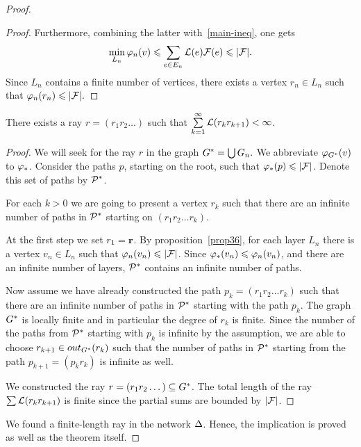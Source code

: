 \documentclass[12pt,oneside,a4paper]{amsart}
\begin{document}
\begin{proof}
\begin{proof}
            Furthermore, combining the latter with~\eqref{main-ineq}, one gets
              \[
              \min_{L_n} \phi_n(v) \leq \sum_{e \in E_n} \len(e) \flowpos(e) \leq \lvert\flowpos\rvert.
              \]
            Since $L_n$ contains a finite number of vertices, there exists a vertex $r_n \in L_n$ such that
              $\phi_n(r_n) \leq \lvert\flowpos\rvert.$
          \end{proof}
          \begin{prop}
            There exists a ray $r=(r_1 r_2\dots)$ such that $\sum\limits_{k=1}^\infty \len(r_kr_{k+1}) < \infty$.
          \end{prop}
          \begin{proof}
            We will seek for the ray $r$ in the graph $\gstar = \bigcup G_n.$
            We abbreviate $\phi_{\gstar}(v)$ to $\phistar$.
            Consider the paths $p$, starting on the root, such that $\phistar(p) \leq \lvert\flowpos\rvert$.
            Denote this set of paths by $\cal{P}^*$.

            For each $k > 0$ we are going to present a vertex $r_k$ such that there are an infinite number of paths
              in $\cal{P}^*$ starting on $(r_1 r_2 \dots r_k)$.

            At the first step we set $r_1 = \root$.
            By proposition~\ref{prop36}, for each layer $L_n$ there is a vertex $v_n \in L_n$ such that
              $\phi_n(v_n) \leq \lvert\flowpos\rvert$.
            Since $\phistar(v_n) \leq \phi_n(v_n)$, and there are an infinite number of layers,
              $\cal{P}^*$ contains an infinite number of paths.

            Now assume we have already constructed the path $p_k = (r_1 r_2\dots r_k)$ such that
              there are an infinite number of paths in $\cal{P}^*$ starting with the path $p_k$.
            The graph $\gstar$ is locally finite and in particular the degree of $r_k$ is finite.
            Since the number of the paths from $\cal{P}^*$ starting with $p_k$ is infinite by the assumption,
              we are able to choose $r_{k+1} \in \eout_{G^*}(r_k)$ such that the number of paths in $\cal{P}^*$ starting from
              the path $p_{k+1}= (p_k r_k)$ is infinite as well.

            We constructed the ray $r = (r_1 r_2 \dots) \subseteq \gstar$.
            The total length of the ray $\sum \len(r_k r_{k+1})$ is finite
              since the partial sums are bounded by $\lvert \flowpos \rvert$.
          \end{proof}
          We found a finite-length ray in the network $\net$.
          Hence, the implication is proved as well as the theorem itself.
      \end{proof}
\end{document}
